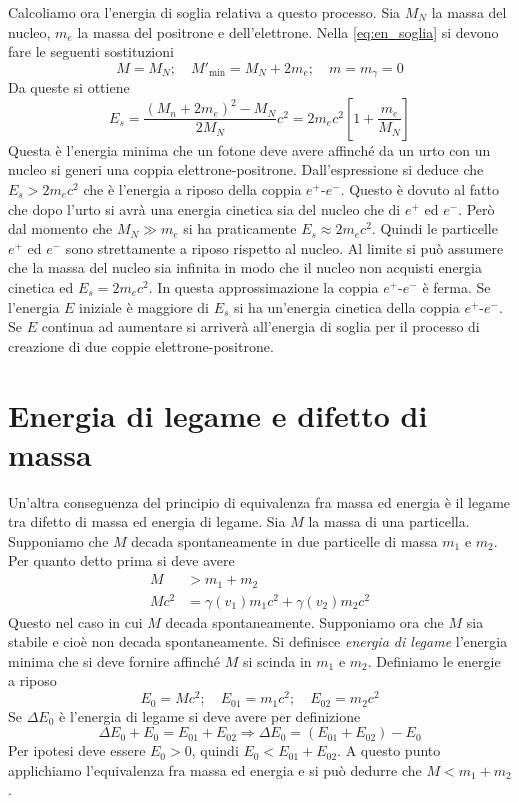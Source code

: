 Calcoliamo ora l'energia di soglia relativa a questo processo. Sia $M_N$ la massa del nucleo, $m_e$ la massa del positrone e dell'elettrone. Nella \eqref{eq:en_soglia} si devono fare le seguenti sostituzioni
\[
M = M_N;\quad M'_\text{min} = M_N + 2m_e;\quad m = m_\gamma = 0
\]
Da queste si ottiene
\begin{equation}
 E_s = \frac{(M_n + 2m_e)^2 - M_N}{2M_N}c^2 = 2m_ec^2\left[1+\frac{m_e}{M_N}\right]
\end{equation}
Questa è l'energia minima che un fotone deve avere affinché da un urto con un nucleo si generi una coppia elettrone-positrone. Dall'espressione si deduce che $E_s > 2m_ec^2$ che è l'energia a riposo della coppia $e^+$-$e^-$. Questo è dovuto al fatto che dopo l'urto si avrà una energia cinetica sia del nucleo che di $e^+$ ed $e^-$. Però dal momento che $M_N\gg m_e$ si ha praticamente $E_s \approx 2m_ec^2$. Quindi le particelle $e^+$ ed $e^-$ sono strettamente a riposo rispetto al nucleo. Al limite si può assumere che la massa del nucleo sia infinita in modo che il nucleo non acquisti energia cinetica ed $E_s = 2m_ec^2$. In questa approssimazione la coppia $e^+$-$e^-$ è ferma. Se l'energia $E$ iniziale è maggiore di $E_s$ si ha un'energia cinetica della coppia $e^+$-$e^-$. Se $E$ continua ad aumentare si arriverà all'energia di soglia per il processo di creazione di due coppie elettrone-positrone.

\section{Energia di legame e difetto di massa}
Un'altra conseguenza del principio di equivalenza fra
massa ed energia è il legame tra difetto di massa ed energia di legame. Sia $M$
la massa di una particella. Supponiamo che $M$ decada spontaneamente in due
particelle di massa $m_1$ e $m_2$. Per quanto detto prima si deve avere
\begin{align*}
M &> m_1 + m_2\\
Mc^2 &= \gamma(v_1) m_1c^2 + \gamma(v_2) m_2c^2
\end{align*}
Questo nel caso in cui $M$ decada spontaneamente. Supponiamo ora che $M$ sia
stabile e cioè non decada spontaneamente. Si definisce \textit{energia di
legame} l'energia minima che si deve fornire affinché $M$ si scinda in $m_1$ e
$m_2$. Definiamo le energie a riposo
\begin{equation}
 E_0 = Mc^2;\quad E_{01} = m_1c^2; \quad E_{02} = m_2c^2
\end{equation}
Se $\Delta E_0$ è l'energia di legame si deve avere per definizione
\begin{equation}
\Delta E_0 + E_0 = E_{01} + E_{02} \Rightarrow \Delta E_0 = (E_{01} + E_{02}) - E_0
\end{equation}
Per ipotesi deve essere $E_0 > 0$, quindi $E_0 < E_{01} + E_{02}$. A questo
punto applichiamo l'equivalenza fra massa ed energia e si può dedurre che $M <
m_1 + m_2$.

